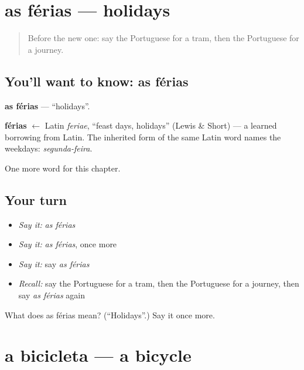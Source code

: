 \section[as férias]{as férias — holidays}

\label{lesson:PT-C91-ferias}



\begin{quote}
Before the new one: say the Portuguese for a tram, then the Portuguese for a journey.
\end{quote}

\subsection*{You'll want to know: as férias}
\textbf{as férias} — \textquotedblleft{}holidays\textquotedblright{}.

\begin{cousinweb}
\textbf{férias} $\leftarrow$ Latin \emph{feriae}, \textquotedblleft{}feast days, holidays\textquotedblright{} (Lewis \& Short) — a learned borrowing from Latin. The inherited form of the same Latin word names the weekdays: \emph{segunda-feira}.
\end{cousinweb}

\begin{grammarlens}[title={What you've built}]
One more word for this chapter.
\end{grammarlens}

\subsection*{Your turn}
\begin{itemize}
\raggedright
  \item \emph{Say it:} \emph{as férias}
  \item \emph{Say it:} \emph{as férias}, once more
  \item \emph{Say it:} say \emph{as férias}
  \item \emph{Recall:} say the Portuguese for a tram, then the Portuguese for a journey, then say \emph{as férias} again
\end{itemize}

\begin{tcolorbox}[breakable,colback=teal!4,colframe=teal!35!black,title={Before you move on}]
What does as férias mean? (\textquotedblleft{}Holidays\textquotedblright{}.) Say it once more.
\end{tcolorbox}
\section[a bicicleta]{a bicicleta — a bicycle}

